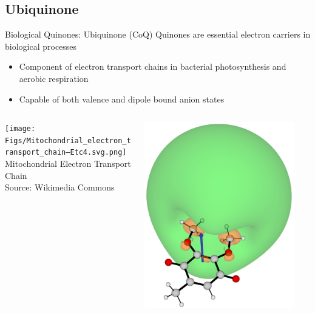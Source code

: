 \documentclass[9pt,t,xcolor=table]{beamer}
\begin{document}
\subsection{Ubiquinone}
\begin{frame}{\huge Biological Quinones: Ubiquinone (CoQ)}\large
	Quinones are essential electron carriers in biological processes
		\vspace{5pt}
		\begin{itemize}
		\item Component of electron transport chains in bacterial photosynthesis and aerobic respiration	
		\item Capable of both valence and dipole bound anion states
		\end{itemize}
		\begin{columns}[b]
			\begin{column}[b]{0.5\textwidth}
				\centering
				\texttt{[image: Figs/Mitochondrial\_electron\_transport\_chain—Etc4.svg.png]}\\
				\small Mitochondrial Electron Transport Chain\\
				\footnotesize Source: Wikimedia Commons
			\end{column}
			\begin{column}[b]{0.25\textwidth}
				\centering
				\includegraphics[width=0.9\textwidth]{Figs/Q0_181.png}\\

\end{column}
\end{columns}
\end{frame}
\end{document}
